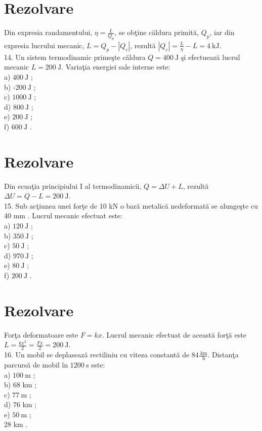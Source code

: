 \section*{Rezolvare}
Din expresia randamentului, $\eta=\frac{L}{Q_{p}}$, se obţine căldura primită, $Q_{p}$, iar din expresia lucrului mecanic, $L=Q_{p}-\left|Q_{c}\right|$, rezultă $\left|Q_{c}\right|=\frac{L}{\eta}-L=4 \mathrm{~kJ}$.\\
14. Un sistem termodinamic primeşte căldura $Q=400 \mathrm{~J}$ şi efectuează lucrul mecanic $L=200 \mathrm{~J}$. Variaţia energiei sale interne este:\\
a) $400 \mathrm{~J}$ ;\\
b) -$200 \mathrm{~J}$ ;\\
c) $1000 \mathrm{~J}$ ;\\
d) $800 \mathrm{~J}$ ;\\
e) $200 \mathrm{~J}$ ;\\
f) $600 \mathrm{~J}$ .

\section*{Rezolvare}
Din ecuaţia principiului I al termodinamicii, $Q=\Delta U+L$, rezultă $\Delta U=Q-L=200 \mathrm{~J}$.\\
15. Sub acţiunea unei forţe de 10 kN o bară metalică nedeformată se alungeşte cu 40 mm . Lucrul mecanic efectuat este:\\
a) $120 \mathrm{~J}$ ;\\
b) $350 \mathrm{~J}$ ;\\
c) $50 \mathrm{~J}$ ;\\
d) $970 \mathrm{~J}$ ;\\
e) $80 \mathrm{~J}$ ;\\
f) $200 \mathrm{~J}$ .

\section*{Rezolvare}
Forţa deformatoare este $F=k x$. Lucrul mecanic efectuat de această forţă este\\
$L=\frac{k x^{2}}{2}=\frac{F x}{2}=200 \mathrm{~J}$.\\
16. Un mobil se deplasează rectiliniu cu viteza constantă de $84 \frac{\mathrm{~km}}{\mathrm{~h}}$. Distanţa parcursă de mobil în $1200 \mathrm{~s}$ este:\\
a) $100 \mathrm{~m}$ ;\\
b) 68 km ;\\
c) $77 \mathrm{~m}$ ;\\
d) 76 km ;\\
e) $50 \mathrm{~m}$ ;\\
28 km .

